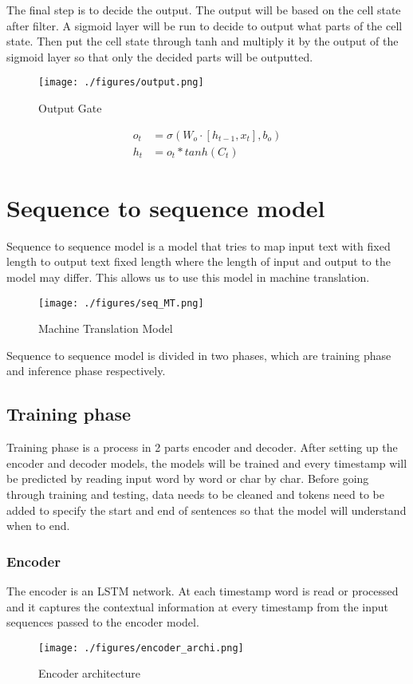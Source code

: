The final step is to decide the output. The output will be based on the cell state after filter. A sigmoid layer will be run to decide to output what parts of the cell state. Then put the cell state through tanh and multiply it by the output of the sigmoid layer so that only the decided parts will be outputted. 

\begin{figure}[h]
	\centering
	\texttt{[image: ./figures/output.png]}
	
	\caption{Output Gate}
\end{figure}

$$	\begin{aligned}
		o_t &= \sigma(W_o \cdot [h_{t-1},x_t], b_o)\\
		h_t &= o_t*tanh(C_t)
	\end{aligned}
$$



\section{Sequence to sequence model}
Sequence to sequence model is a model that tries to map input text with fixed length to output text fixed length where the length of input and output to the model may differ. This allows us to use this model in machine translation.
\begin{figure}[h]
	\centering
	\texttt{[image: ./figures/seq\_MT.png]}
	
	\caption{Machine Translation Model}
\end{figure}

Sequence to sequence model is divided in two phases, which are training phase and inference phase respectively. 

\subsection{Training phase}
Training phase is a process in 2 parts encoder and decoder. After setting up the encoder and decoder models, the models will be trained and every timestamp will be predicted by reading input word by word or char by char. Before going through training and testing, data needs to be cleaned and tokens need to be added to specify the start and end of sentences so that the model will understand when to end.

\subsubsection{Encoder}
The encoder is an LSTM network. At each timestamp word is read or processed and it captures the contextual information at every timestamp from the input sequences passed to the encoder model.
\begin{figure}[h]
	\centering
	\texttt{[image: ./figures/encoder\_archi.png]}
	
	\caption{Encoder architecture}
\end{figure}

